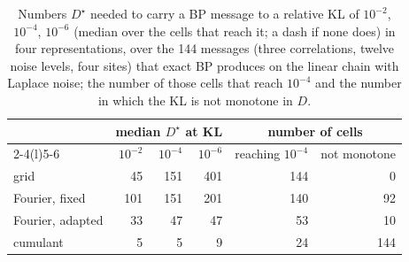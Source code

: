 \begin{table}[t]
\setlength{\tabcolsep}{5pt}
\centering
\small
\caption{Numbers $D^\star$ needed to carry a BP message to a relative KL of $10^{-2}$, $10^{-4}$, $10^{-6}$ (median over the cells that reach it; a dash if none does) in four representations, over the 144 messages (three correlations, twelve noise levels, four sites) that exact BP produces on the linear chain with Laplace noise; the number of those cells that reach $10^{-4}$ and the number in which the KL is not monotone in $D$.}
\label{tab:fourier}
\begin{tabular}{@{}lrrrrr@{}}
\toprule
& \multicolumn{3}{c}{median $D^\star$ at KL} & \multicolumn{2}{c}{number of cells} \\
\cmidrule(lr){2-4}\cmidrule(l){5-6}
& $10^{-2}$ & $10^{-4}$ & $10^{-6}$ & reaching $10^{-4}$ & not monotone \\
\midrule
grid & 45 & 151 & 401 & 144 & 0 \\
Fourier, fixed & 101 & 151 & 201 & 140 & 92 \\
Fourier, adapted & 33 & 47 & 47 & 53 & 10 \\
cumulant & 5 & 5 & 9 & 24 & 144 \\
\bottomrule
\end{tabular}
\end{table}
